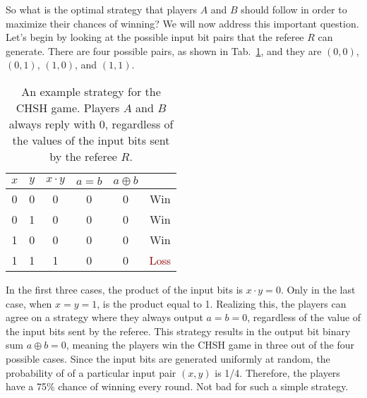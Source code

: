 So what is the optimal strategy that players $A$ and $B$ should follow in order to maximize their chances of winning?
We will now address this important question.
Let's begin by looking at the possible input bit pairs that the referee $R$ can generate.
There are four possible pairs, as shown in Tab.~\ref{tab:4-2_chsh_strategy}, and they are $(0,0)$, $(0,1)$, $(1,0)$, and $(1,1)$.
\begin{table}[h]
    \setcellgapes{5pt}
    \renewcommand\theadfont{}
    \makegapedcells
    \centering
    \begin{tabular}{cccccc}
        \hline
        $x$ & $y$ & $x\cdot y$ & $a=b$ & $a\oplus b$ & \\
        \hline
        0 & 0 & 0 & 0 & 0 & \textcolor{newgreen}{Win} \\
        0 & 1 & 0 & 0 & 0 & \textcolor{newgreen}{Win} \\
        1 & 0 & 0 & 0 & 0 & \textcolor{newgreen}{Win} \\
        1 & 1 & 1 & 0 & 0 & \textcolor{darkred}{Loss} \\
        \hline
    \end{tabular}
    \caption[CHSH game classical strategy.]{An example strategy for the CHSH game. Players $A$ and $B$ always reply with 0, regardless of the values of the input bits sent by the referee $R$.}
    \label{tab:4-2_chsh_strategy}
\end{table}
In the first three cases, the product of the input bits is $x\cdot y=0$. Only in the last case, when $x=y=1$, is the product equal to 1.
Realizing this, the players can agree on a strategy where they always output $a=b=0$, regardless of the value of the input bits sent by the referee.
This strategy results in the output bit binary sum $a\oplus b=0$, meaning the players win the CHSH game in three out of the four possible cases.
Since the input bits are generated uniformly at random, the probability of of a particular input pair $(x,y)$ is 1/4.
Therefore, the players have a 75\% chance of winning every round.
Not bad for such a simple strategy.

